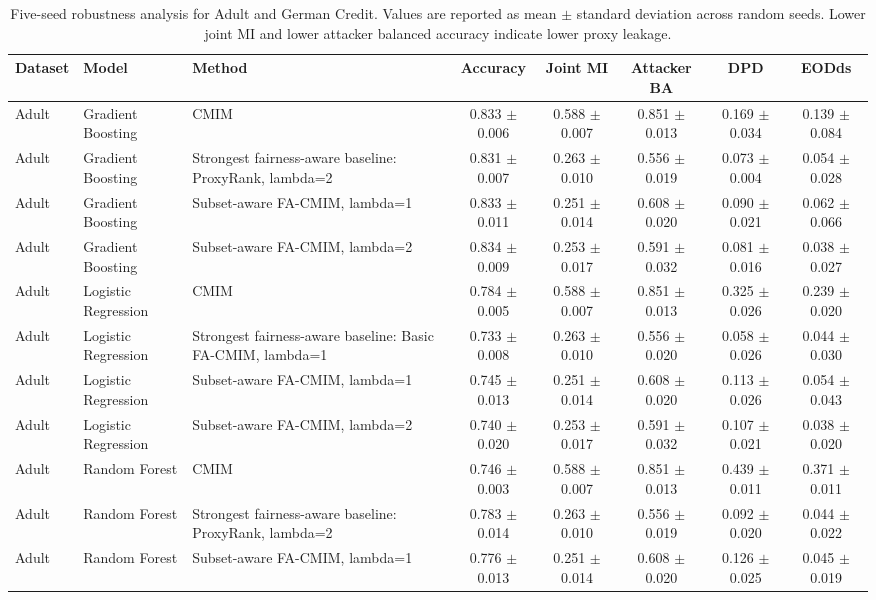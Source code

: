 \begin{table}
\caption{Five-seed robustness analysis for Adult and German Credit. Values are reported as mean $\pm$ standard deviation across random seeds. Lower joint MI and lower attacker balanced accuracy indicate lower proxy leakage.}
\label{tab:seed-robustness-main}
\begin{tabular}{lllccccc}
\toprule
Dataset & Model & Method & Accuracy & Joint MI & Attacker BA & DPD & EODds \\
\midrule
Adult & Gradient Boosting & CMIM & 0.833 $\pm$ 0.006 & 0.588 $\pm$ 0.007 & 0.851 $\pm$ 0.013 & 0.169 $\pm$ 0.034 & 0.139 $\pm$ 0.084 \\
Adult & Gradient Boosting & Strongest fairness-aware baseline: ProxyRank, lambda=2 & 0.831 $\pm$ 0.007 & 0.263 $\pm$ 0.010 & 0.556 $\pm$ 0.019 & 0.073 $\pm$ 0.004 & 0.054 $\pm$ 0.028 \\
Adult & Gradient Boosting & Subset-aware FA-CMIM, lambda=1 & 0.833 $\pm$ 0.011 & 0.251 $\pm$ 0.014 & 0.608 $\pm$ 0.020 & 0.090 $\pm$ 0.021 & 0.062 $\pm$ 0.066 \\
Adult & Gradient Boosting & Subset-aware FA-CMIM, lambda=2 & 0.834 $\pm$ 0.009 & 0.253 $\pm$ 0.017 & 0.591 $\pm$ 0.032 & 0.081 $\pm$ 0.016 & 0.038 $\pm$ 0.027 \\
Adult & Logistic Regression & CMIM & 0.784 $\pm$ 0.005 & 0.588 $\pm$ 0.007 & 0.851 $\pm$ 0.013 & 0.325 $\pm$ 0.026 & 0.239 $\pm$ 0.020 \\
Adult & Logistic Regression & Strongest fairness-aware baseline: Basic FA-CMIM, lambda=1 & 0.733 $\pm$ 0.008 & 0.263 $\pm$ 0.010 & 0.556 $\pm$ 0.020 & 0.058 $\pm$ 0.026 & 0.044 $\pm$ 0.030 \\
Adult & Logistic Regression & Subset-aware FA-CMIM, lambda=1 & 0.745 $\pm$ 0.013 & 0.251 $\pm$ 0.014 & 0.608 $\pm$ 0.020 & 0.113 $\pm$ 0.026 & 0.054 $\pm$ 0.043 \\
Adult & Logistic Regression & Subset-aware FA-CMIM, lambda=2 & 0.740 $\pm$ 0.020 & 0.253 $\pm$ 0.017 & 0.591 $\pm$ 0.032 & 0.107 $\pm$ 0.021 & 0.038 $\pm$ 0.020 \\
Adult & Random Forest & CMIM & 0.746 $\pm$ 0.003 & 0.588 $\pm$ 0.007 & 0.851 $\pm$ 0.013 & 0.439 $\pm$ 0.011 & 0.371 $\pm$ 0.011 \\
Adult & Random Forest & Strongest fairness-aware baseline: ProxyRank, lambda=2 & 0.783 $\pm$ 0.014 & 0.263 $\pm$ 0.010 & 0.556 $\pm$ 0.019 & 0.092 $\pm$ 0.020 & 0.044 $\pm$ 0.022 \\
Adult & Random Forest & Subset-aware FA-CMIM, lambda=1 & 0.776 $\pm$ 0.013 & 0.251 $\pm$ 0.014 & 0.608 $\pm$ 0.020 & 0.126 $\pm$ 0.025 & 0.045 $\pm$ 0.019 \\

\end{tabular}
\end{table}
